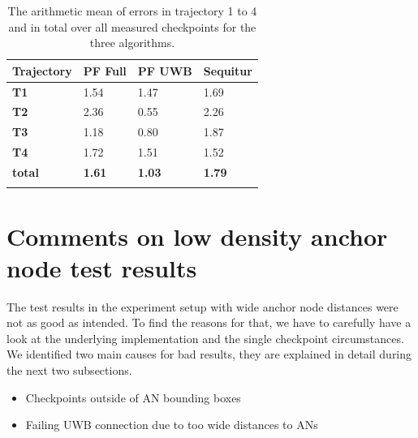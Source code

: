 \begin{table}
\caption{The arithmetic mean of errors in trajectory 1 to 4 and in total over all measured checkpoints for the three algorithms.}
\label{tab:arithmetic_errors}
\centering
\begin{tabular}{l l l l}
\toprule
\textbf{Trajectory} & \textbf{PF Full} & \textbf{PF UWB} & \textbf{Sequitur}\\
\midrule
\textbf{T1} & 1.54 & 1.47 & 1.69\\
\textbf{T2} & 2.36 & 0.55 & 2.26\\
\textbf{T3} & 1.18 & 0.80 & 1.87\\
\textbf{T4} & 1.72 & 1.51 & 1.52\\
\midrule
\textbf{total}  & \textbf{1.61} & \textbf{1.03} & \textbf{1.79}\\
\bottomrule\\
\end{tabular}
\end{table}


\section{Comments on low density anchor node test results}
\label{Section2}
The test results in the experiment setup with wide anchor node distances were not as good as intended. To find the reasons for that, we have to carefully have a look at the underlying implementation and the single checkpoint circumstances. We identified two main causes for bad results, they are explained in detail during the next two subsections.
\begin{itemize}
\item Checkpoints outside of AN bounding boxes
\item Failing UWB connection due to too wide distances to ANs
\end{itemize}

